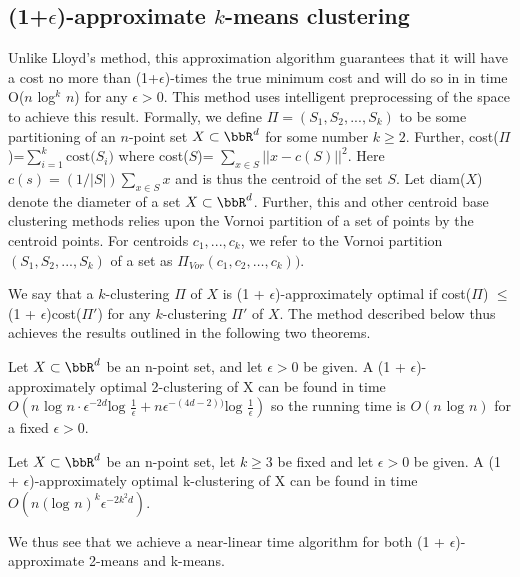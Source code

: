 \subsection{(1+$\epsilon$)-approximate $k$-means clustering}

Unlike Lloyd's method, this approximation algorithm guarantees that it will have
a cost no more than (1+$\epsilon$)-times the true minimum cost and will do so in
in time O($n$ log$^k$ $n$) for any $\epsilon>0$. This method uses intelligent
preprocessing of the space to achieve this result. Formally, we define
$\Pi = (S_1, S_2, ..., S_k)$ to be some partitioning of an $n$-point set
$X \subset \bbR^d$ for some number $k \geq 2$. Further, cost($\Pi$)=$\sum_{i=1}^k \text{cost(}S_i)$ where cost($S$)=
$\sum_{x \in S} ||x-c(S)||^2$. Here $c(s)=(1/|S|) \sum_{x \in S} x$ and is
thus the centroid of the set $S$. Let diam($X$) denote the diameter of a set
$X \subset \bbR^d$. Further, this and other centroid base clustering methods relies upon the Vornoi partition of a set of points by the centroid points.
For centroids $c_1,...,c_k$, we refer to the Vornoi partition $(S_1,S_2,...,S_k)$ of a set
as $\Pi_{Vor}(c_1, c_2, \dots, c_k))$.

We say that a $k$-clustering $\Pi$ of $X$ is (1 + $\epsilon$)-approximately optimal if cost($\Pi$) $\leq$ (1 + $\epsilon$)cost($\Pi'$) for any $k$-clustering $\Pi'$ of $X$. The method described below thus achieves the results outlined in the following two theorems.

\begin{theorem}
Let $X \subset \bbR^d$ be an n-point set, and let $\epsilon >0$ be given. A (1 + $\epsilon$)-approximately optimal 2-clustering of X can be found in time $O(n\text{ log }n \cdot \epsilon^{-2d} \text{log }\frac{1}{\epsilon} + n \epsilon^{-(4d-2))}\text{log }\frac{1}{\epsilon})$ so the running time is $O(n\text{ log }n)$ for a fixed $\epsilon>0$.
\end{theorem}

\begin{theorem}
Let $X \subset \bbR^d$ be an n-point set, let $k \geq 3$ be fixed and let $\epsilon >0$ be given. A (1 + $\epsilon$)-approximately optimal k-clustering of X can be found in time $O(n(\text{log }n)^k \epsilon^{-2k^2d})$.
\end{theorem}

We thus see that we achieve a near-linear time algorithm for both (1 + $\epsilon$)-approximate 2-means and k-means.

